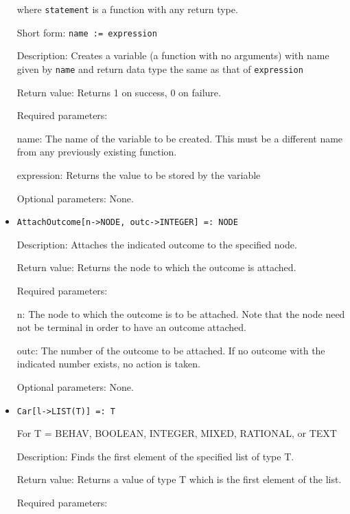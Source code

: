 \begin{itemize}
where \verb+statement+ is a function with any return type.  
\bd
\item
[Short form:] \verb+name := expression+
\item
[Description:] Creates a variable (a function with no arguments) with name
given by \verb+name+ and return data type the same as that of
\verb+expression+
\item
[Return value:] Returns 1 on success, 0 on failure.  
\item
[Required parameters:]\hfil\null
\bd
\item
[name:] The name of the variable to be created.  This must be a different
name from any previously existing function.  
\item
[expression:] Returns the value to be stored by the variable
\ed
\item
[Optional parameters:] None.
\ed

\item
\protect \large \begin{verbatim}
AttachOutcome[n->NODE, outc->INTEGER] =: NODE
\end{verbatim}\normalsize

\bd
\item
[Description:] Attaches the indicated outcome to the specified node.
\item
[Return value:] Returns the node to which the outcome is attached.
\item
[Required parameters:]\hfil\null

\bd
\item
[n:] The node to which the outcome is to be attached.  Note that the
node need not be terminal in order to have an outcome attached.
\item
[outc:] The number of the outcome to be attached.  If no outcome with
the indicated number exists, no action is taken.
\ed

\item
[Optional parameters:] None.
\ed

\item

\protect \large \begin{verbatim}
Car[l->LIST(T)] =: T
\end{verbatim}\normalsize

For T = BEHAV, BOOLEAN, INTEGER, MIXED, RATIONAL, or TEXT

\bd
\item
[Description:] Finds the first element of the specified list of type
T.
\item
[Return value:] Returns a value of type T which is the first element
of the list.
\item 
[Required parameters:]\hfil\null
	

\end{itemize}
